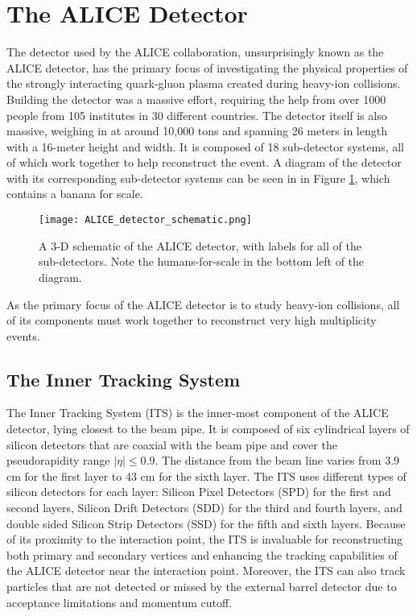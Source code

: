 \section{The ALICE Detector}
The detector used by the ALICE collaboration, unsurprisingly known as the ALICE detector, has the primary focus of investigating the physical properties of the strongly interacting quark-gluon plasma created during heavy-ion collisions.
Building the detector was a massive effort, requiring the help from over 1000 people from 105 institutes in 30 different countries. 
The detector itself is also massive, weighing in at around 10,000 tons and spanning 26 meters in length with a 16-meter height and width.
It is composed of 18 sub-detector systems, all of which work together to help reconstruct the event.
A diagram of the detector with its corresponding sub-detector systems can be seen in in Figure \ref{alice_detector}, which contains a banana for scale.
\begin{figure}
    \centering
    \texttt{[image: ALICE\_detector\_schematic.png]}
    \caption{A 3-D schematic of the ALICE detector, with labels for all of the sub-detectors. Note the humans-for-scale in the bottom left of the diagram.}
    \label{alice_detector}
\end{figure}
As the primary focus of the ALICE detector is to study heavy-ion collisions, all of its components must work together to reconstruct very high multiplicity events. 

\subsection{The Inner Tracking System}

The Inner Tracking System (ITS) is the inner-most component of the ALICE detector, lying closest to the beam pipe. It is composed of six cylindrical layers of silicon detectors that are coaxial with the beam pipe and cover the pseudorapidity range $|\eta| \leq 0.9$. The distance from the beam line varies from 3.9 cm for the first layer to 43 cm for the sixth layer. The ITS uses different types of silicon detectors for each layer: Silicon Pixel Detectors (SPD) for the first and second layers, Silicon Drift Detectors (SDD) for the third and fourth layers, and double sided Silicon Strip Detectors (SSD) for the fifth and sixth layers. Because of its proximity to the interaction point, the ITS is invaluable for reconstructing both primary and secondary vertices and enhancing the tracking capabilities of the ALICE detector near the interaction point. Moreover, the ITS can also track particles that are not detected or missed by the external barrel detector due to acceptance limitations and momentum cutoff. 

